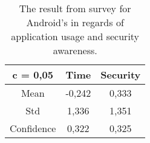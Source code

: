 \begin{table}[ht]
    \centering
    \begin{tabular}{ |c|c|c| } 
        \hline
        \rowcolor{light-gray}
        c = 0,05    & Time  &   Security\\
        \hline
        Mean    &	-0,242  &	0,333 \\ 
        \hline
        Std &   1,336   &	1,351\\ 
        \hline
        Confidence  &	0,322   &	0,325 \\ 
        \hline
    \end{tabular}
    \caption{\label{tab:iPhone-survey}The result from survey for Android's in regards of application usage and security awareness.}
\end{table}